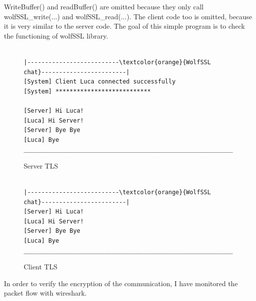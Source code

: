 \documentclass[a4paper,12pt]{article}
\begin{document}
WriteBuffer() and readBuffer() are omitted because they only call wolfSSL\_write(...) and wolfSSL\_read(...).
The client code too is omitted, because it is very similar to the server code.
The goal of this simple program is to check the functioning of wolfSSL library. 

\begin{figure}[H]
\begin{Verbatim}[commandchars=\\\{\}]

|--------------------------\textcolor{orange}{WolfSSL chat}------------------------|
[System] Client Luca connected successfully                           
[System] ***************************                                        
 	 	                                                                                       
[Server] Hi Luca!                                                                       
[Luca] Hi Server!                                                                       
[Server] Bye Bye                                                                       
[Luca] Bye                                                                                 
______________________________________________________________|
\end{Verbatim}
\caption{Server TLS}
\end{figure}
\begin{figure}[H]
\begin{Verbatim}[commandchars=\\\{\}]

|--------------------------\textcolor{orange}{WolfSSL chat}------------------------|                                    	 	                                                                                       
[Server] Hi Luca!                                                                       
[Luca] Hi Server!                                                                       
[Server] Bye Bye                                                                       
[Luca] Bye                                                                                 
______________________________________________________________|
\end{Verbatim}
\caption{Client TLS}
\end{figure}

In order to verify the encryption of the communication, I have monitored the packet flow with wireshark.
\end{document}

